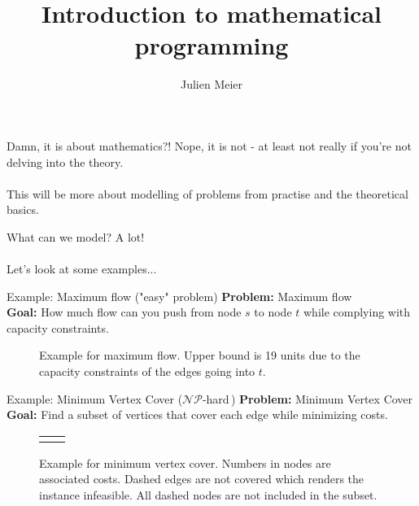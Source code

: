 \documentclass[10pt]{beamer}
\title{Introduction to mathematical programming}
\author{Julien Meier}
\newcommand{\nphard}{$\mathcal{NP}$-hard\,}
\begin{document}
\maketitle

\begin{frame}{Damn, it is about mathematics?!}
Nope, it is not - at least not really if you're not delving into the theory.\\\,\\


This will be more about modelling of problems from practise and the theoretical basics.
\end{frame}

\begin{frame}{What can we model?}
A lot!\\\,\\

Let's look at some examples...
\end{frame}



\begin{frame}{Example: Maximum flow ("easy" problem)}
\textbf{Problem:} Maximum flow\\
\textbf{Goal:} How much flow can you push from node $s$ to node $t$ while complying with capacity constraints.\\

\begin{figure}
	\centering
	\scalebox{1.4}{\maxFlow}
	\caption{Example for maximum flow. Upper bound is 19 units due to the capacity constraints of the edges going into $t$.}
\end{figure}
\end{frame}

\begin{frame}{Example: Minimum Vertex Cover (\nphard)}
\textbf{Problem:} Minimum Vertex Cover\\
\textbf{Goal:} Find a subset of vertices that cover each edge while minimizing costs.\\

\begin{figure}
	\centering
\begin{tabular}{c c}
	\mvcSufficient
	\mvcInsufficient
\end{tabular}
	\caption{Example for minimum vertex cover. Numbers in nodes are associated costs. Dashed edges are not covered which renders the instance infeasible. All dashed nodes are not included in the subset.}
\end{figure}
\end{frame}
\end{document}
